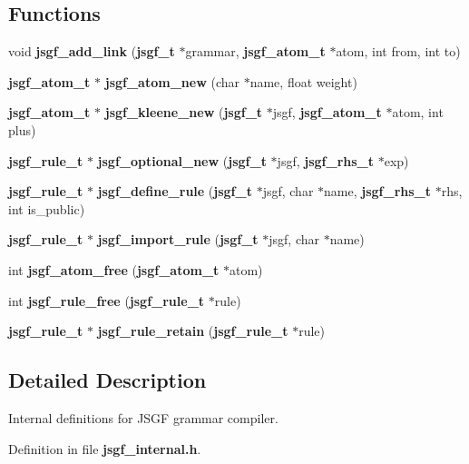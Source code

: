 \subsection*{Functions}
\begin{DoxyCompactItemize}
\item 
void {\bfseries jsgf\-\_\-add\-\_\-link} ({\bf jsgf\-\_\-t} $\ast$grammar, {\bf jsgf\-\_\-atom\-\_\-t} $\ast$atom, int from, int to)\label{jsgf__internal_8h_acb5af4a04abc56a8584eba9b937f8154}

\item 
{\bf jsgf\-\_\-atom\-\_\-t} $\ast$ {\bfseries jsgf\-\_\-atom\-\_\-new} (char $\ast$name, float weight)\label{jsgf__internal_8h_a0e59b63784fa8761358bb2bdf568bec1}

\item 
{\bf jsgf\-\_\-atom\-\_\-t} $\ast$ {\bfseries jsgf\-\_\-kleene\-\_\-new} ({\bf jsgf\-\_\-t} $\ast$jsgf, {\bf jsgf\-\_\-atom\-\_\-t} $\ast$atom, int plus)\label{jsgf__internal_8h_ab9dc2ab39224cda76c43822150cf7e67}

\item 
{\bf jsgf\-\_\-rule\-\_\-t} $\ast$ {\bfseries jsgf\-\_\-optional\-\_\-new} ({\bf jsgf\-\_\-t} $\ast$jsgf, {\bf jsgf\-\_\-rhs\-\_\-t} $\ast$exp)\label{jsgf__internal_8h_a4a07cb0721add8783f0ea24dfacd6c0f}

\item 
{\bf jsgf\-\_\-rule\-\_\-t} $\ast$ {\bfseries jsgf\-\_\-define\-\_\-rule} ({\bf jsgf\-\_\-t} $\ast$jsgf, char $\ast$name, {\bf jsgf\-\_\-rhs\-\_\-t} $\ast$rhs, int is\-\_\-public)\label{jsgf__internal_8h_ae7e6644fc37252110c3c0ea0edd229f7}

\item 
{\bf jsgf\-\_\-rule\-\_\-t} $\ast$ {\bfseries jsgf\-\_\-import\-\_\-rule} ({\bf jsgf\-\_\-t} $\ast$jsgf, char $\ast$name)\label{jsgf__internal_8h_afe1e47584e4dd80929552ffed77373f2}

\item 
int {\bfseries jsgf\-\_\-atom\-\_\-free} ({\bf jsgf\-\_\-atom\-\_\-t} $\ast$atom)\label{jsgf__internal_8h_a289d683bf62d1a5aaac6917fa64f54f2}

\item 
int {\bfseries jsgf\-\_\-rule\-\_\-free} ({\bf jsgf\-\_\-rule\-\_\-t} $\ast$rule)\label{jsgf__internal_8h_af2faf6fb74ad1e4d43cf990c1bcec672}

\item 
{\bf jsgf\-\_\-rule\-\_\-t} $\ast$ {\bfseries jsgf\-\_\-rule\-\_\-retain} ({\bf jsgf\-\_\-rule\-\_\-t} $\ast$rule)\label{jsgf__internal_8h_ad152a23eb0f0d9af8417919fc93074fd}

\end{DoxyCompactItemize}


\subsection{Detailed Description}
Internal definitions for J\-S\-G\-F grammar compiler. 

Definition in file {\bf jsgf\-\_\-internal.\-h}.

